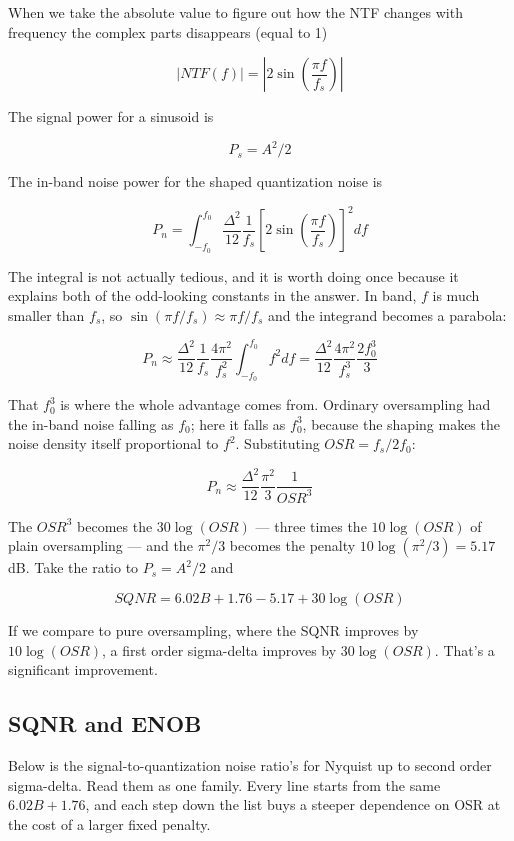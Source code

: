 When we take the absolute value to figure out how the NTF changes with
frequency the complex parts disappears (equal to 1)

\[\vert NTF(f)\vert = \left\vert 2 \sin\left(\frac{\pi f}{f_s}\right)\right\vert \]

The signal power for a sinusoid is

\[ P_s = A^2/2\]

The in-band noise power for the shaped quantization noise is

\[ P_n = \int_{-f_0}^{f_0} \frac{\Delta^2}{12}\frac{1}{f_s}\left[2 \sin\left(\frac{\pi f}{f_s}\right)\right]^2 df\]

The integral is not actually tedious, and it is worth doing once because
it explains both of the odd-looking constants in the answer. In band,
\(f\) is much smaller than \(f_s\), so
\(\sin(\pi f/f_s) \approx \pi f/f_s\) and the integrand becomes a
parabola:

\[ P_n \approx \frac{\Delta^2}{12}\frac{1}{f_s}\frac{4\pi^2}{f_s^2}\int_{-f_0}^{f_0} f^2 df = \frac{\Delta^2}{12}\frac{4\pi^2}{f_s^3}\frac{2f_0^3}{3} \]

That \(f_0^3\) is where the whole advantage comes from. Ordinary
oversampling had the in-band noise falling as \(f_0\); here it falls as
\(f_0^3\), because the shaping makes the noise density itself
proportional to \(f^2\). Substituting \(OSR = f_s/2f_0\):

\[ P_n \approx \frac{\Delta^2}{12}\frac{\pi^2}{3}\frac{1}{OSR^3} \]

The \(OSR^3\) becomes the \(30\log(OSR)\) --- three times the
\(10\log(OSR)\) of plain oversampling --- and the \(\pi^2/3\) becomes
the penalty \(10\log(\pi^2/3) = 5.17\) dB. Take the ratio to
\(P_s = A^2/2\) and

\[SQNR = 6.02 B + 1.76 - 5.17 + 30 \log(OSR)\]

If we compare to pure oversampling, where the SQNR improves by
\(10 \log(OSR)\), a first order sigma-delta improves by
\(30 \log(OSR)\). That's a significant improvement.

\subsection{SQNR and ENOB}\label{sqnr-and-enob}

Below is the signal-to-quantization noise ratio's for Nyquist up to
second order sigma-delta. Read them as one family. Every line starts
from the same \(6.02B + 1.76\), and each step down the list buys a
steeper dependence on OSR at the cost of a larger fixed penalty.

